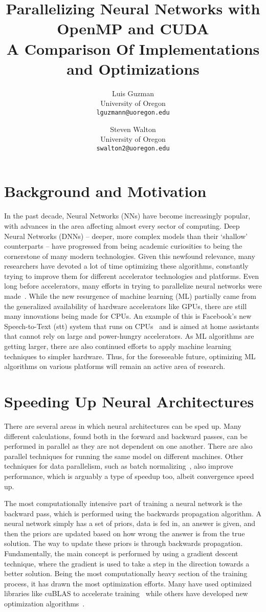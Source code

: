 \documentclass[10pt,twocolumn,letterpaper]{article}
\title{Parallelizing Neural Networks with OpenMP and CUDA\\
\small{A Comparison Of Implementations and Optimizations}}
\author{Luis Guzman\\
University of Oregon\\
{\tt\small lguzmann@uoregon.edu}
\and
Steven Walton\\
University of Oregon\\
{\tt\small swalton2@uoregon.edu}
}
\begin{document}
 
%
\maketitle 
%
\section{Background and Motivation} 
%
In the past decade, Neural Networks (NNs) have become increasingly popular, with advances in the area affecting almost every sector of computing. Deep Neural Networks (DNNs) \--- deeper, more complex models than their `shallow' counterparts \--- have progressed from being academic curiosities to being the cornerstone of many modern technologies. Given this newfound relevance, many researchers have devoted a lot of time optimizing these algorithms, constantly trying to improve them for different accelerator technologies and platforms. Even long before accelerators, many efforts in trying to parallelize neural networks were made~\cite{10.1007/BFb0024235}. While the new resurgence of machine learning (ML) partially came from the generalized availability of hardware accelerators like GPUs, there are still many innovations being made for CPUs. An example of this is Facebook's new Speech-to-Text (stt) system that runs on CPUs~\cite{fbcpu} and is aimed at home assistants that cannot rely on large and power-hungry accelerators. As ML algorithms are getting larger, there are also continued efforts to apply machine learning techniques to simpler hardware. Thus, for the foreseeable future, optimizing ML algorithms on various platforms will remain an active area of research.  

\section{Speeding Up Neural Architectures}
%
There are several areas in which neural architectures can be sped up. Many different calculations, found both in the forward and backward passes, can be performed in parallel as they are not dependent on one another. There are also parallel techniques for running the same model on different machines. Other techniques for data parallelism, such as batch normalizing~\cite{DBLP:journals/corr/IoffeS15}, also improve performance, which is arguably a type of speedup too, albeit convergence speed up. 

The most computationally intensive part of training a neural network is the backward pass, which is performed using the backwards propagation algorithm. A neural network simply has a set of priors, data is fed in, an answer is given, and then the priors are updated based on how wrong the answer is from the true solution. The way to update these priors is through backwards propagation. Fundamentally, the main concept is performed by using a gradient descent technique, where the gradient is used to take a step in the direction towards a better solution. Being the most computationally heavy section of the training process, it has drawn the most optimization efforts. Many have used optimized libraries like cuBLAS to accelerate training~\cite{5708849} while others have developed new optimization algorithms~\cite{DBLP:journals/corr/KingmaB14}. 
\end{document}
